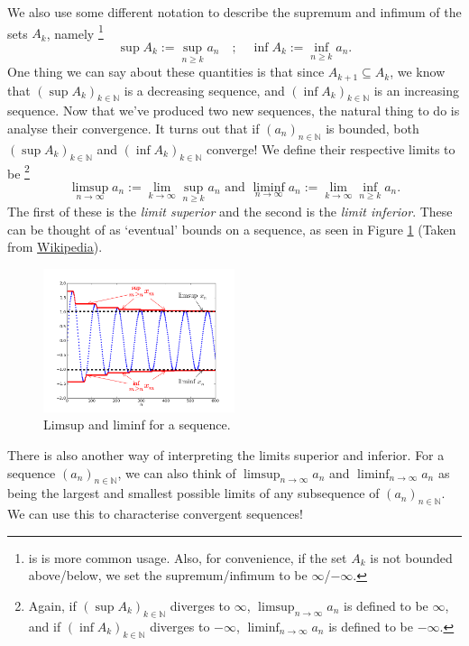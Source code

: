 \documentclass[
  12pt,
  a4paper]{extarticle}
\theoremstyle{plain}
\theoremstyle{plain}
\theoremstyle{plain}
\theoremstyle{plain}
\theoremstyle{plain}
\theoremstyle{definition}
\theoremstyle{definition}
\theoremstyle{definition}
\theoremstyle{remark}
\renewcommand{\;}{\,}
\begin{document}
We also use some different notation to describe the supremum and infimum of the sets \(A_k\), namely \footnote{is is more common usage. Also, for convenience, if the set \(A_k\) is not bounded above/below, we set the supremum/infimum to be \(\infty\)/\(-\infty\).} \[\sup A_k := \sup_{n\geq k}a_n \quad ; \quad \inf A_k := \inf_{n \geq k}a_n.\] One thing we can say about these quantities is that since \(A_{k+1} \subseteq A_k\), we know that \((\sup A_k)_{k\in\mathbb{N}}\) is a decreasing sequence, and \((\inf A_k)_{k\in\mathbb{N}}\) is an increasing sequence. Now that we've produced two new sequences, the natural thing to do is analyse their convergence. It turns out that if \((a_n)_{n\in\mathbb{N}}\) is bounded, both \((\sup A_k)_{k\in\mathbb{N}}\) and \((\inf A_k)_{k\in\mathbb{N}}\) converge! We define their respective limits to be \footnote{Again, if \((\sup A_k)_{k\in\mathbb{N}}\) diverges to \(\infty\), \(\limsup_{n \to \infty} a_n\) is defined to be \(\infty\), and if \((\inf A_k)_{k\in\mathbb{N}}\) diverges to \(-\infty\), \(\liminf_{n \to \infty} a_n\) is defined to be \(-\infty\).} \[\limsup_{n \to \infty} a_n := \lim_{k\to\infty}\sup_{n\geq k}a_n \;\, \text{and} \;\, \liminf_{n \to \infty} a_n := \lim_{k\to\infty}\inf_{n\geq k}a_n.\] The first of these is the \emph{limit superior} and the second is the \emph{limit inferior}. These can be thought of as `eventual' bounds on a sequence, as seen in Figure \ref{fig:limsup} (Taken from \href{https://en.wikipedia.org/wiki/Limit_inferior_and_limit_superior}{Wikipedia}).

\begin{figure}
\centering
\includegraphics[width=0.5\textwidth,height=\textheight]{Lim_sup_example_5.png}
\caption{\label{fig:limsup} Limsup and liminf for a sequence.}
\end{figure}

There is also another way of interpreting the limits superior and inferior. For a sequence \((a_n)_{n\in\mathbb{N}}\), we can also think of \(\limsup_{n\to\infty} a_n\) and \(\liminf_{n \to \infty}a_n\) as being the largest and smallest possible limits of any subsequence of \((a_n)_{n\in\mathbb{N}}\). We can use this to characterise convergent sequences!
\end{document}
